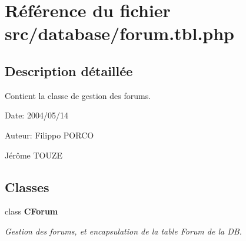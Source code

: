\section{Référence du fichier src/database/forum.tbl.php}
\label{forum_8tbl_8php}


\subsection{Description détaillée}
Contient la classe de gestion des forums. 

\begin{Desc}
\item[Date:]2004/05/14\end{Desc}
\begin{Desc}
\item[Auteur:]Filippo PORCO 

Jérôme TOUZE \end{Desc}


\subsection*{Classes}
\begin{CompactItemize}
\item 
class {\bf CForum}
\begin{CompactList}\small\item\em Gestion des forums, et encapsulation de la table Forum de la DB. \item\end{CompactList}\end{CompactItemize}
